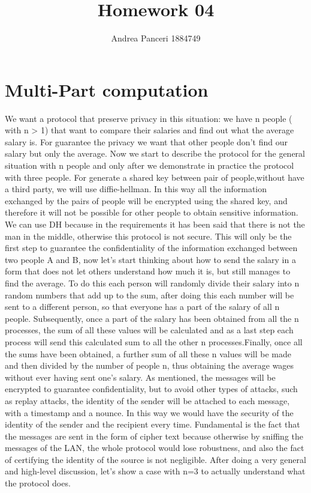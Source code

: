 \documentclass{article}
\title{Homework 04}
\author{Andrea Panceri 1884749}
\begin{document}
\maketitle

\section{Multi-Part computation}
We want a protocol that preserve privacy in this situation: we have n people ( with n > 1) that want to compare their salaries and find out what the average salary is. For guarantee the privacy we want that other people don't find our salary but only the average.
Now we start to describe the protocol for the general situation with n people and only after we demonstrate in practice the protocol with three people. For generate a shared key between pair of people,without have a third party, we will use diffie-hellman. In this way all the information exchanged by the pairs of people will be encrypted using the shared key, and therefore it will not be possible for other people to obtain sensitive information. We can use DH because in the requirements it has been said that there is not the man in the middle, otherwise this protocol is not secure. 
This will only be the first step to guarantee the confidentiality of the information exchanged between two people A and B, now let's start thinking about how to send the salary in a form that does not let others understand how much it is, but still manages to find the average. To do this each person will randomly divide their salary into n random numbers that add up to the sum, after doing this each number will be sent to a different person, so that everyone has a part of the salary of all n people. Subsequently, once a part of the salary has been obtained from all the n processes, the sum of all these values will be calculated and as a last step each process will send this calculated sum to all the other n processes.Finally, once all the sums have been obtained, a further sum of all these n values will be made and then divided by the number of people n, thus obtaining the average wages without ever having sent one's salary. As mentioned, the messages will be encrypted to guarantee confidentiality, but to avoid other types of attacks, such as replay attacks, the identity of the sender will be attached to each message, with a timestamp and a nounce. In this way we would have the security of the identity of the sender and the recipient every time. Fundamental is the fact that the messages are sent in the form of cipher text because otherwise by sniffing the messages of the LAN, the whole protocol would lose robustness, and also the fact of certifying the identity of the source is not negligible. After doing a very general and high-level discussion, let's show a case with n=3 to actually understand what the protocol does.\\
\end{document}
